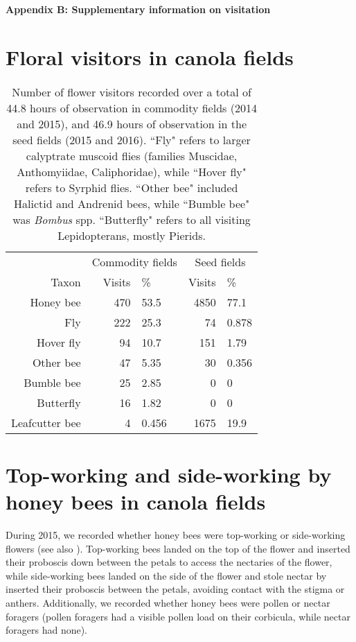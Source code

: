 
\pagebreak
\begin{center}
\textbf{\large Appendix B: Supplementary information on visitation}
\end{center}

\section*{Floral visitors in canola fields}

\begin{table}[h]
    \begin{tabular}{r|r|l|r|l}
     & \multicolumn{2}{c|}{Commodity fields} & \multicolumn{2}{c}{Seed fields} \\ \cline{2-5}
    Taxon & Visits & \% & Visits & \% \\ \hline
    Honey bee & 470 & 53.5 & 4850 & 77.1 \\
    Fly & 222 & 25.3 & 74 & 0.878 \\
    Hover fly & 94 & 10.7 & 151 & 1.79 \\
    Other bee & 47 & 5.35 & 30 & 0.356 \\
    Bumble bee & 25 & 2.85 & 0 & 0 \\
    Butterfly & 16 & 1.82 & 0 & 0 \\
    Leafcutter bee & 4 & 0.456 & 1675 & 19.9 \\
    \end{tabular}
    \caption{Number of flower visitors recorded over a total of 44.8 hours of observation in commodity fields (2014 and 2015), and 46.9 hours of observation in the seed fields (2015 and 2016). ``Fly" refers to larger calyptrate muscoid flies (families Muscidae, Anthomyiidae, Caliphoridae), while ``Hover fly" refers to Syrphid flies. ``Other bee" included Halictid and Andrenid bees, while ``Bumble bee" was \textit{Bombus} spp. ``Butterfly" refers to all visiting Lepidopterans, mostly Pierids.}
    \label{tab:propVisitors}  
\end{table}

\section*{Top-working and side-working by honey bees in canola fields}

During 2015, we recorded whether honey bees were top-working or side-working flowers (see also \citealp{free1973, free1983, mohr1988}).
Top-working bees landed on the top of the flower and inserted their proboscis down between the petals to access the nectaries of the flower, while side-working bees landed on the side of the flower and stole nectar by inserted their proboscis between the petals, avoiding contact with the stigma or anthers. 
Additionally, we recorded whether honey bees were pollen or nectar foragers (pollen foragers had a visible pollen load on their corbicula, while nectar foragers had none).

